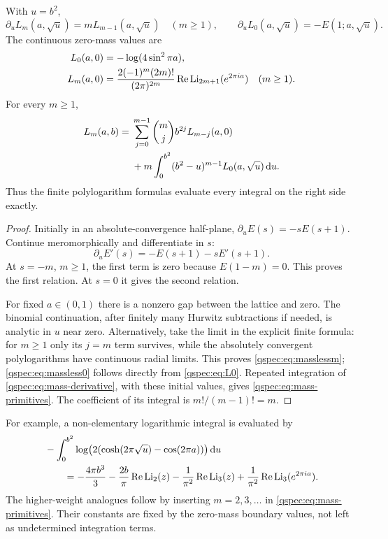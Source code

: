 \begin{theorem}
\label{qspec:thm:mass-ladder}
With $u=b^2$,
\begin{equation}\label{qspec:eq:mass-derivative}
\partial_u L_m(a,\sqrt u)=mL_{m-1}(a,\sqrt u)\quad(m\ge1),
\qquad
\partial_u L_0(a,\sqrt u)=-E(1;a,\sqrt u).
\end{equation}
The continuous zero-mass values are
\begin{align}
L_0(a,0)&=-\log(4\sin^2\pi a),\label{qspec:eq:massless0}\\
L_m(a,0)&=\frac{2(-1)^m(2m)!}{(2\pi)^{2m}}
\operatorname{Re}\operatorname{Li}_{2m+1}(e^{2\pi ia})\quad(m\ge1).
\label{qspec:eq:masslessm}
\end{align}
For every $m\ge1$,
\begin{align}
L_m(a,b)={}&\sum_{j=0}^{m-1}\binom mj b^{2j}L_{m-j}(a,0)\notag\\
&+m\int_0^{b^2}(b^2-u)^{m-1}L_0(a,\sqrt u)\,\mathrm{d} u.
\label{qspec:eq:mass-primitives}
\end{align}
Thus the finite polylogarithm formulas evaluate every integral on the
right side exactly.
\end{theorem}
\begin{proof}
Initially in an absolute-convergence half-plane,
$\partial_u E(s)=-sE(s+1)$. Continue meromorphically and differentiate
in $s$:
\[
\partial_u E'(s)=-E(s+1)-sE'(s+1).
\]
At $s=-m$, $m\ge1$, the first term is zero because
$E(1-m)=0$. This proves the first relation. At $s=0$ it gives the
second relation.

For fixed $a\in(0,1)$ there is a nonzero gap between the lattice and
zero. The binomial continuation, after finitely many Hurwitz
subtractions if needed, is analytic in $u$ near zero. Alternatively,
take the limit in the explicit finite formula: for $m\ge1$ only its
$j=m$ term survives, while the absolutely convergent polylogarithms
have continuous radial limits. This proves
\eqref{qspec:eq:masslessm}; \eqref{qspec:eq:massless0} follows directly
from \eqref{qspec:eq:L0}. Repeated integration of
\eqref{qspec:eq:mass-derivative}, with these initial values, gives
\eqref{qspec:eq:mass-primitives}. The coefficient of its integral is
$m!/(m-1)!=m$.
\end{proof}

For example, a non-elementary logarithmic integral is evaluated by
\begin{align}
&-\int_0^{b^2}\log\bigl(2(\cosh(2\pi\sqrt u)-\cos(2\pi a))\bigr)\,\mathrm{d} u\notag\\
&\qquad=-\frac{4\pi b^3}{3}-\frac{2b}{\pi}\operatorname{Re}\operatorname{Li}_2(z)
-\frac1{\pi^2}\operatorname{Re}\operatorname{Li}_3(z)
+\frac1{\pi^2}\operatorname{Re}\operatorname{Li}_3(e^{2\pi ia}).
\label{qspec:eq:log-mass-integral}
\end{align}
The higher-weight analogues follow by inserting $m=2,3,\ldots$ in
\eqref{qspec:eq:mass-primitives}. Their constants are fixed by the
zero-mass boundary values, not left as undetermined integration terms.

